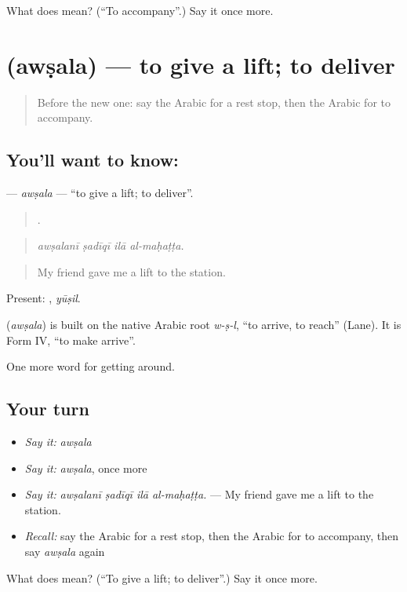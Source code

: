 \begin{tcolorbox}[breakable,colback=teal!4,colframe=teal!35!black,title={Before you move on}]
What does  mean? (\textquotedblleft{}To accompany\textquotedblright{}.) Say it once more.
\end{tcolorbox}
\section[\texorpdfstring{\ar{أوصل} (awṣala)}{أوصل (awṣala)}]{ (awṣala) — to give a lift; to deliver}

\label{lesson:AR-C440-awsala}



\begin{quote}
Before the new one: say the Arabic for a rest stop, then the Arabic for to accompany.
\end{quote}

\subsection*{You'll want to know: }
\textbf{} — \emph{awṣala} — \textquotedblleft{}to give a lift; to deliver\textquotedblright{}.

\begin{quote}
   .
\end{quote}

\begin{quote}
\emph{awṣalanī ṣadīqī ilā al-maḥaṭṭa.}
\end{quote}

\begin{quote}
My friend gave me a lift to the station.
\end{quote}

Present: , \emph{yūṣil}.

\begin{cousinweb}
\textbf{} (\emph{awṣala}) is built on the native Arabic root \emph{w-ṣ-l}, \textquotedblleft{}to arrive, to reach\textquotedblright{} (Lane). It is Form IV, \textquotedblleft{}to make arrive\textquotedblright{}.
\end{cousinweb}

\begin{grammarlens}[title={What you've built}]
One more word for getting around.
\end{grammarlens}

\subsection*{Your turn}
\begin{itemize}
\raggedright
  \item \emph{Say it:} \emph{awṣala}
  \item \emph{Say it:} \emph{awṣala}, once more
  \item \emph{Say it:} \emph{awṣalanī ṣadīqī ilā al-maḥaṭṭa.} — My friend gave me a lift to the station.
  \item \emph{Recall:} say the Arabic for a rest stop, then the Arabic for to accompany, then say \emph{awṣala} again
\end{itemize}

\begin{tcolorbox}[breakable,colback=teal!4,colframe=teal!35!black,title={Before you move on}]
What does  mean? (\textquotedblleft{}To give a lift; to deliver\textquotedblright{}.) Say it once more.
\end{tcolorbox}
